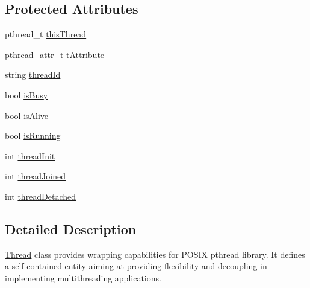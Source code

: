 \subsection*{Protected Attributes}
\begin{DoxyCompactItemize}
\item 
pthread\-\_\-t \hyperlink{classit_1_1testbench_1_1rte_1_1Thread_a461aaef7afe799a65616727b58b069d8}{this\-Thread}
\item 
pthread\-\_\-attr\-\_\-t \hyperlink{classit_1_1testbench_1_1rte_1_1Thread_a564b0b9b90d76effbcdc6164e5d1a8d6}{t\-Attribute}
\item 
string \hyperlink{classit_1_1testbench_1_1rte_1_1Thread_a5c9db3a81df5fc51a3987e4a3ca6aace}{thread\-Id}
\item 
bool \hyperlink{classit_1_1testbench_1_1rte_1_1Thread_a66f2d3623fbaaebf8aea079fb509ef7e}{is\-Busy}
\item 
bool \hyperlink{classit_1_1testbench_1_1rte_1_1Thread_aab48976fffdc87659876c6e4661715ad}{is\-Alive}
\item 
bool \hyperlink{classit_1_1testbench_1_1rte_1_1Thread_a2011457d637ada9026f8ab2c2ca14763}{is\-Running}
\item 
int \hyperlink{classit_1_1testbench_1_1rte_1_1Thread_ada467f1ac1ac01c62c245bce9ac379fd}{thread\-Init}
\item 
int \hyperlink{classit_1_1testbench_1_1rte_1_1Thread_af5a9dd2c81470f0c41113f461bc91ed0}{thread\-Joined}
\item 
int \hyperlink{classit_1_1testbench_1_1rte_1_1Thread_a5ef7815e90cae33d623e09160bf65ade}{thread\-Detached}
\end{DoxyCompactItemize}


\subsection{Detailed Description}
\hyperlink{classit_1_1testbench_1_1rte_1_1Thread}{Thread} class provides wrapping capabilities for P\-O\-S\-I\-X pthread library. It defines a self contained entity aiming at providing flexibility and decoupling in implementing multithreading applications. 

